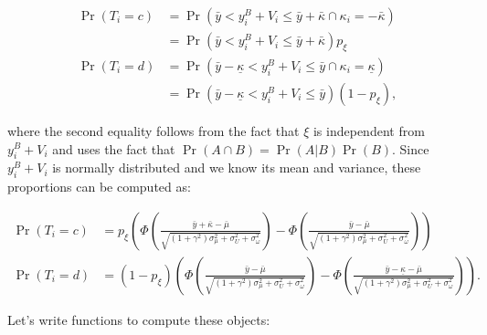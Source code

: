 \documentclass[
]{book}
\theoremstyle{definition}
\theoremstyle{definition}
\theoremstyle{definition}
\theoremstyle{definition}
\theoremstyle{remark}
\begin{document}
\begin{align*}
  \Pr(T_i=c) & = \Pr(\bar{y}< y_i^B+V_i\leq\bar{y}+\bar{\kappa}\cap\kappa_i=-\bar{\kappa}) \\
              & = \Pr(\bar{y}< y_i^B+V_i\leq\bar{y}+\bar{\kappa})p_{\xi} \\
  \Pr(T_i=d) & = \Pr(\bar{y}-\underline{\kappa}< y_i^B+V_i\leq\bar{y}\cap\kappa_i=\underline{\kappa}) \\
              & = \Pr(\bar{y}-\underline{\kappa}< y_i^B+V_i\leq\bar{y})(1-p_{\xi}),
\end{align*}

where the second equality follows from the fact that \(\xi\) is independent from \(y_i^B+V_i\) and uses the fact that \(\Pr(A\cap B)=\Pr(A|B)\Pr(B)\).
Since \(y_i^B+V_i\) is normally distributed and we know its mean and variance, these proportions can be computed as:

\begin{align*}
  \Pr(T_i=c) & = p_{\xi}\left(\Phi\left(\frac{\bar{y}+\bar{\kappa}-\bar{\mu}}{\sqrt{(1+\gamma^2)\sigma^2_{\mu}+\sigma^2_U+\sigma^2_{\omega}}}\right)
                  -\Phi\left(\frac{\bar{y}-\bar{\mu}}{\sqrt{(1+\gamma^2)\sigma^2_{\mu}+\sigma^2_U+\sigma^2_{\omega}}}\right)\right) \\
  \Pr(T_i=d) & = (1-p_{\xi})\left(\Phi\left(\frac{\bar{y}-\bar{\mu}}{\sqrt{(1+\gamma^2)\sigma^2_{\mu}+\sigma^2_U+\sigma^2_{\omega}}}\right)
                  -\Phi\left(\frac{\bar{y}-\underline{\kappa}-\bar{\mu}}{\sqrt{(1+\gamma^2)\sigma^2_{\mu}+\sigma^2_U+\sigma^2_{\omega}}}\right)\right).
\end{align*}

Let's write functions to compute these objects:
\end{document}
